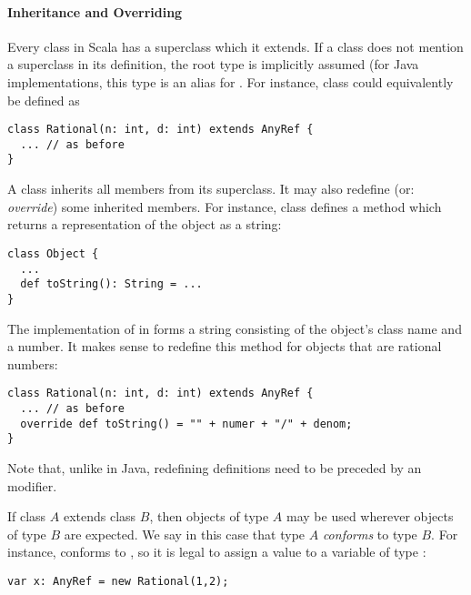 \documentclass[a4paper,12pt,twoside,titlepage]{book}
\begin{document}
\paragraph{Inheritance and Overriding}
Every class in Scala has a superclass which it extends.  
If a class
does not mention a superclass in its definition, the root type
 is implicitly assumed (for Java implementations,
this type is an alias for . For instance, class
 could equivalently be defined as
\begin{lstlisting}
class Rational(n: int, d: int) extends AnyRef {
  ... // as before
}
\end{lstlisting}
A class inherits all members from its superclass. It may also redefine
(or: {\em override}) some inherited members. For instance, class
 defines
a method
 which returns a representation of the object as a string:
\begin{lstlisting}
class Object {
  ...
  def toString(): String = ...
}
\end{lstlisting}
The implementation of  in 
forms a string consisting of the object's class name and a number. It
makes sense to redefine this method for objects that are rational
numbers:
\begin{lstlisting}
class Rational(n: int, d: int) extends AnyRef {
  ... // as before
  override def toString() = "" + numer + "/" + denom;
}
\end{lstlisting}
Note that, unlike in Java, redefining definitions need to be preceded
by an  modifier.

If class $A$ extends class $B$, then objects of type $A$ may be used
wherever objects of type $B$ are expected. We say in this case that
type $A$ {\em conforms} to type $B$.  For instance, 
conforms to , so it is legal to assign a 
value to a variable of type :
\begin{lstlisting}
var x: AnyRef = new Rational(1,2);
\end{lstlisting}
\end{document}
